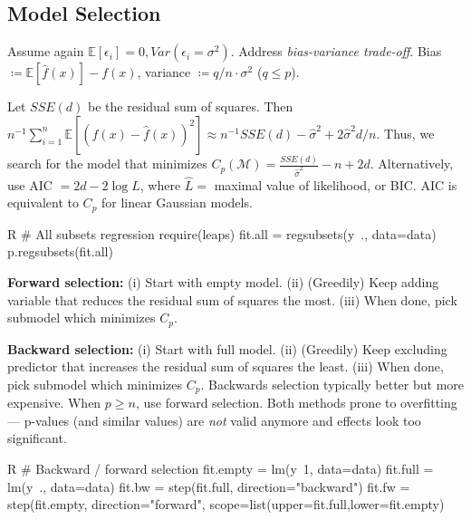 \subsection{Model Selection}\label{subsec:model_selection}
\begin{sectionbox}\nospacing{}
  Assume again $\mathbb{E}[\epsilon_{i}] = 0, Var(\epsilon_{i} = \sigma^{2})$.
  Address \emph{bias-variance trade-off}.
  Bias $\coloneq\mathbb{E} [\hat f(x)] - f(x)$, variance $\coloneq q/n \cdot \sigma^{2}$ ($q \leq p$).
\end{sectionbox}
\begin{sectionbox}\nospacing{}
  Let $SSE(d)$ be the residual sum of squares.
  Then $n^{-1} \sum_{i=1}^{n} \mathbb{E}\left[{(f(x) - \hat f(x))}^{2}\right] \approx n^{-1}SSE(d)-\hat \sigma^{2} + 2\hat\sigma^{2}d/n$.
  Thus, we search for the model that minimizes $C_{p}(\mathcal{M}) = \frac{SSE(d)}{\hat \sigma^{2}} - n + 2d$.
  Alternatively, use AIC $=2d-2\log \hat{L}$, where $\hat{L}=$ maximal value of likelihood, or BIC. AIC is equivalent to $C_{p}$ for linear Gaussian models.
  \begin{mintlinebox}{R}
    # All subsets regression
    require(leaps)
    fit.all = regsubsets(y~., data=data)
    p.regsubsets(fit.all)
  \end{mintlinebox}
\end{sectionbox}
\begin{sectionbox}\nospacing{}
  \textbf{Forward selection:} (i) Start with empty model. (ii) (Greedily) Keep adding variable that reduces the residual sum of squares the most. (iii) When done, pick submodel which minimizes $C_{p}$.

  \textbf{Backward selection:} (i) Start with full model. (ii) (Greedily) Keep excluding predictor that increases the residual sum of squares the least. (iii) When done, pick submodel which minimizes $C_{p}$.
  Backwards selection typically better but more expensive. When $p \geq n$, use forward selection.
  Both methods prone to overfitting --- p-values (and similar values) are \emph{not} valid anymore and effects look too significant.
  \begin{mintlinebox}{R}
    # Backward / forward selection
    fit.empty = lm(y~1, data=data)
    fit.full = lm(y~., data=data)
    fit.bw = step(fit.full, direction="backward")
    fit.fw = step(fit.empty, direction="forward", scope=list(upper=fit.full,lower=fit.empty)
  \end{mintlinebox}

\end{sectionbox}
